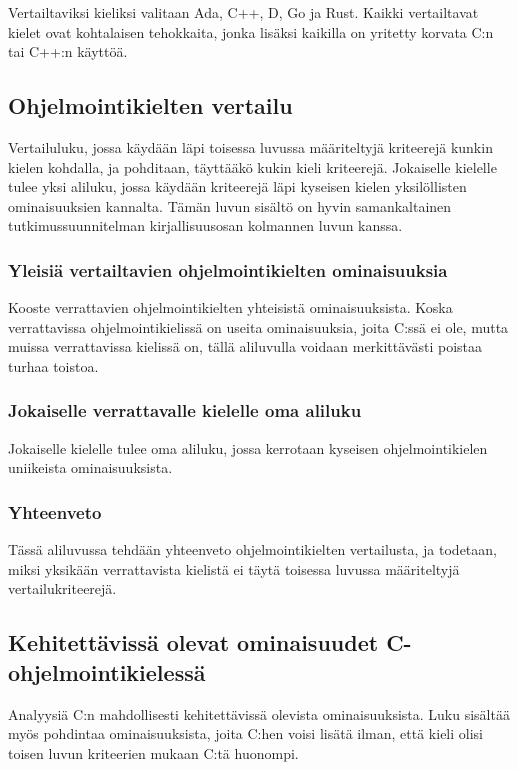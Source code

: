 Vertailtaviksi kieliksi valitaan Ada, C++, D, Go ja Rust. Kaikki vertailtavat
kielet ovat kohtalaisen tehokkaita, jonka lisäksi kaikilla on yritetty korvata
C:n tai C++:n käyttöä.

\subsection{Ohjelmointikielten vertailu}

Vertailuluku, jossa käydään läpi toisessa luvussa määriteltyjä kriteerejä
kunkin kielen kohdalla, ja pohditaan, täyttääkö kukin kieli kriteerejä.
Jokaiselle kielelle tulee yksi aliluku, jossa käydään kriteerejä läpi kyseisen
kielen yksilöllisten ominaisuuksien kannalta. Tämän luvun sisältö on hyvin
samankaltainen tutkimussuunnitelman kirjallisuusosan kolmannen luvun kanssa.

\subsubsection{Yleisiä vertailtavien ohjelmointikielten ominaisuuksia}

Kooste verrattavien ohjelmointikielten yhteisistä ominaisuuksista. Koska
verrattavissa ohjelmointikielissä on useita ominaisuuksia, joita C:ssä ei ole,
mutta muissa verrattavissa kielissä on, tällä aliluvulla voidaan merkittävästi
poistaa turhaa toistoa.

\subsubsection{Jokaiselle verrattavalle kielelle oma aliluku}

Jokaiselle kielelle tulee oma aliluku, jossa kerrotaan kyseisen
ohjelmointikielen uniikeista ominaisuuksista.

\subsubsection{Yhteenveto}

Tässä aliluvussa tehdään yhteenveto ohjelmointikielten vertailusta, ja
todetaan, miksi yksikään verrattavista kielistä ei täytä toisessa luvussa
määriteltyjä vertailukriteerejä.

\subsection{Kehitettävissä olevat ominaisuudet C-ohjelmointikielessä}

Analyysiä C:n mahdollisesti kehitettävissä olevista ominaisuuksista. Luku
sisältää myös pohdintaa ominaisuuksista, joita C:hen voisi lisätä ilman, että
kieli olisi toisen luvun kriteerien mukaan C:tä huonompi.

